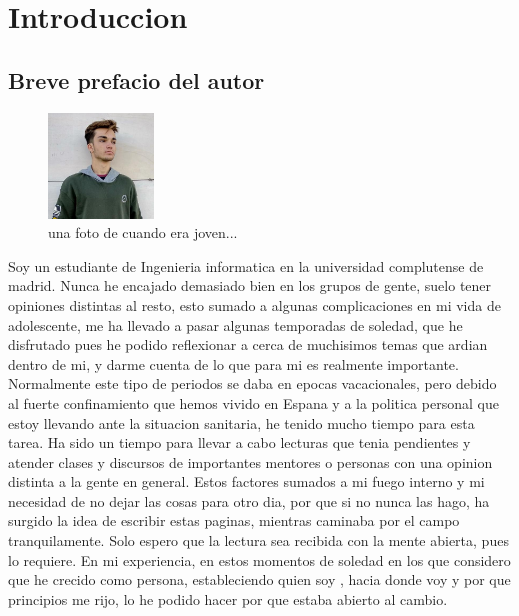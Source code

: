 
\chapter{Introduccion}
\section{Breve prefacio del autor}
\begin{figure}
	\centering
	\includegraphics[width=0.25\textwidth]{figures/mi_foto.jpeg}
	\caption{una foto de cuando era joven...}
\end{figure}

Soy un estudiante de Ingenieria informatica en la universidad complutense de madrid. Nunca he encajado demasiado bien en los grupos de gente, suelo tener opiniones distintas al resto, esto sumado a algunas complicaciones en mi vida de adolescente, me ha llevado a pasar algunas temporadas de soledad, que he disfrutado pues he podido reflexionar a cerca de muchisimos temas que ardian dentro de mi, y darme cuenta de lo que para mi es realmente importante. 
Normalmente este tipo de periodos se daba en epocas vacacionales, pero debido al fuerte confinamiento que hemos vivido en Espana y a la politica personal que estoy llevando ante la situacion sanitaria, he tenido mucho tiempo para esta tarea. Ha sido un tiempo para llevar a cabo lecturas que tenia pendientes y atender clases y discursos de importantes mentores o personas con una opinion distinta a la gente en general.
Estos factores sumados a mi fuego interno y mi necesidad de no dejar las cosas para otro dia, por que si no nunca las hago, ha surgido la idea de escribir estas paginas, mientras caminaba por el campo tranquilamente.
Solo espero que la lectura sea recibida con la mente abierta, pues lo requiere. En mi experiencia, en estos momentos de soledad en los que considero que he crecido como persona, estableciendo quien soy , hacia donde voy y por que principios me rijo, lo he podido hacer por que estaba abierto al cambio. 
